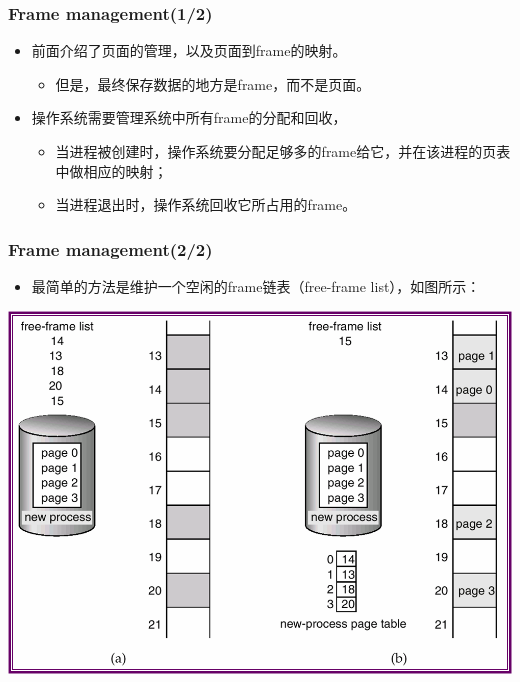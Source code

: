 \documentclass[CJKutf8,xcolor=pdftex,dvipsnames,table]{beamer}
\begin{document}
\begin{CJK*}{UTF8}{song}
\fi

  \begin{frame}
  \frametitle{Frame management(1/2)} \pause
  \begin{itemize}
  \item{前面介绍了页面的管理，以及页面到frame的映射。} \pause
    \begin{itemize}
    \item{但是，最终保存数据的地方是frame，而不是页面。} \pause
    \end{itemize}
  \item{操作系统需要管理系统中所有frame的分配和回收，} \pause
    \begin{itemize}
    \item{当进程被创建时，操作系统要分配足够多的frame给它，并在该进程的页表中做相应的映射；} \pause
    \item{当进程退出时，操作系统回收它所占用的frame。}
    \end{itemize}
  \end{itemize}
  \end{frame}
  
  \begin{frame}
  \frametitle{Frame management(2/2)} \pause
  \begin{itemize}
  \item{最简单的方法是维护一个空闲的frame链表（free-frame list），如图所示：} \pause
  \end{itemize}
  \begin{center}
    \includegraphics[scale=.5]{v6f9-9}
  \end{center}
  \end{frame}
  

\end{CJK*}
\end{document}
